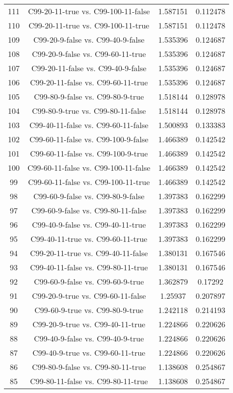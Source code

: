 \documentclass[a4paper,10pt]{article}
\begin{document}
\begin{landscape}
\begin{table}[!htp]
\begin{tabular}{cccc}
111&C99-20-11-true vs. C99-100-11-false&1.587151&0.112478\\
110&C99-20-11-true vs. C99-100-11-true&1.587151&0.112478\\
109&C99-20-9-false vs. C99-40-9-false&1.535396&0.124687\\
108&C99-20-9-false vs. C99-60-11-true&1.535396&0.124687\\
107&C99-20-11-false vs. C99-40-9-false&1.535396&0.124687\\
106&C99-20-11-false vs. C99-60-11-true&1.535396&0.124687\\
105&C99-80-9-false vs. C99-80-9-true&1.518144&0.128978\\
104&C99-80-9-true vs. C99-80-11-false&1.518144&0.128978\\
103&C99-40-11-false vs. C99-60-11-false&1.500893&0.133383\\
102&C99-60-11-false vs. C99-100-9-false&1.466389&0.142542\\
101&C99-60-11-false vs. C99-100-9-true&1.466389&0.142542\\
100&C99-60-11-false vs. C99-100-11-false&1.466389&0.142542\\
99&C99-60-11-false vs. C99-100-11-true&1.466389&0.142542\\
98&C99-60-9-false vs. C99-80-9-false&1.397383&0.162299\\
97&C99-60-9-false vs. C99-80-11-false&1.397383&0.162299\\
96&C99-40-9-false vs. C99-40-11-true&1.397383&0.162299\\
95&C99-40-11-true vs. C99-60-11-true&1.397383&0.162299\\
94&C99-20-11-true vs. C99-40-11-false&1.380131&0.167546\\
93&C99-40-11-false vs. C99-80-11-true&1.380131&0.167546\\
92&C99-60-9-false vs. C99-60-9-true&1.362879&0.17292\\
91&C99-20-9-true vs. C99-60-11-false&1.25937&0.207897\\
90&C99-60-9-true vs. C99-80-9-true&1.242118&0.214193\\
89&C99-20-9-true vs. C99-40-11-true&1.224866&0.220626\\
88&C99-40-9-false vs. C99-40-9-true&1.224866&0.220626\\
87&C99-40-9-true vs. C99-60-11-true&1.224866&0.220626\\
86&C99-80-9-false vs. C99-80-11-true&1.138608&0.254867\\
85&C99-80-11-false vs. C99-80-11-true&1.138608&0.254867\\

\end{tabular}
\end{table}
\end{landscape}
\end{document}
